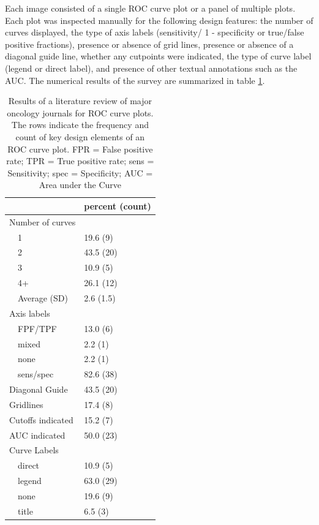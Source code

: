 \documentclass[article]{jss}
\begin{document}
Each image consisted of a single ROC curve plot or a panel of multiple
plots. Each plot was inspected manually for the following design
features: the number of curves displayed, the type of axis labels
(sensitivity/ 1 - specificity or true/false positive fractions),
presence or absence of grid lines, presence or absence of a diagonal
guide line, whether any cutpoints were indicated, the type of curve
label (legend or direct label), and presence of other textual
annotations such as the AUC. The numerical results of the survey are
summarized in table \ref{table1}.

\begin{table}[ht]
\centering
\begin{tabular}{ll}
  \hline
 & percent (count) \\ 
  \hline
Number of curves &  \\ 
  $\quad$1 & 19.6 (9) \\ 
  $\quad$2 & 43.5 (20) \\ 
  $\quad$3 & 10.9 (5) \\ 
  $\quad$4+ & 26.1 (12) \\ 
  $\quad$Average (SD) & 2.6 (1.5) \\ 
  Axis labels &  \\ 
  $\quad$FPF/TPF & 13.0 (6) \\ 
  $\quad$mixed & 2.2 (1) \\ 
  $\quad$none & 2.2 (1) \\ 
  $\quad$sens/spec & 82.6 (38) \\ 
  Diagonal Guide & 43.5 (20) \\ 
  Gridlines & 17.4 (8) \\ 
  Cutoffs indicated & 15.2 (7) \\ 
  AUC indicated & 50.0 (23) \\ 
  Curve Labels &  \\ 
  $\quad$direct & 10.9 (5) \\ 
  $\quad$legend & 63.0 (29) \\ 
  $\quad$none & 19.6 (9) \\ 
  $\quad$title & 6.5 (3) \\ 
   \hline
\end{tabular}
\caption{Results of a literature review of major oncology journals for ROC curve plots. The rows indicate the frequency and count of key design elements of an ROC curve plot. FPR = False positive rate; TPR = True positive rate; sens = Sensitivity; spec = Specificity; AUC = Area under the Curve} 
\label{table1}
\end{table}
\end{document}
